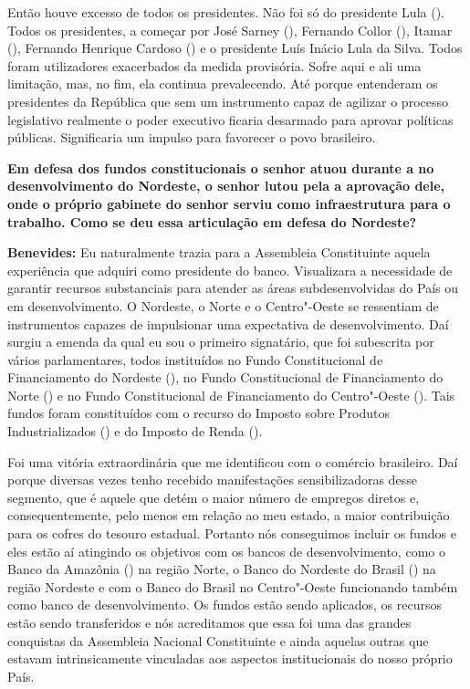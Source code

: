 Então houve excesso de todos os presidentes. Não foi só do presidente
Lula (). Todos os presidentes, a começar por José Sarney (),
Fernando Collor (), Itamar (), Fernando Henrique Cardoso () e
o presidente Luís Inácio Lula da Silva. Todos foram utilizadores
exacerbados da medida provisória. Sofre aqui e ali uma limitação, mas,
no fim, ela continua prevalecendo. Até porque entenderam os presidentes
da República que sem um instrumento capaz de agilizar o processo
legislativo realmente o poder executivo ficaria desarmado para aprovar
políticas públicas. Significaria um impulso para favorecer o povo
brasileiro.

\textbf{Em defesa dos fundos constitucionais o senhor atuou durante a
 no desenvolvimento do Nordeste, o senhor lutou pela a aprovação
dele, onde o próprio gabinete do senhor serviu como infraestrutura para
o trabalho. Como se deu essa articulação em defesa do Nordeste?}

\textbf{Benevides:} Eu naturalmente trazia para a Assembleia
Constituinte aquela experiência que adquiri como presidente do banco.
Visualizara a necessidade de garantir recursos substanciais para atender
as áreas subdesenvolvidas do País ou em desenvolvimento. O Nordeste, o
Norte e o Centro"-Oeste se ressentiam de instrumentos capazes de
impulsionar uma expectativa de desenvolvimento. Daí surgiu a emenda da
qual eu sou o primeiro signatário, que foi subescrita por vários
parlamentares, todos instituídos no Fundo Constitucional de
Financiamento do Nordeste (), no Fundo Constitucional de
Financiamento do Norte () e no Fundo Constitucional de Financiamento
do Centro"-Oeste (). Tais fundos foram constituídos com o recurso do
Imposto sobre Produtos Industrializados () e do Imposto de Renda
().

Foi uma vitória extraordinária que me identificou com o comércio
brasileiro. Daí porque diversas vezes tenho recebido manifestações
sensibilizadoras desse segmento, que é aquele que detém o maior número
de empregos diretos e, consequentemente, pelo menos em relação ao meu
estado, a maior contribuição para os cofres do tesouro estadual.
Portanto nós conseguimos incluir os fundos e eles estão aí atingindo os
objetivos com os bancos de desenvolvimento, como o Banco da Amazônia
() na região Norte, o Banco do Nordeste do Brasil () na região
Nordeste e com o Banco do Brasil no Centro"-Oeste funcionando também como
banco de desenvolvimento. Os fundos estão sendo aplicados, os recursos
estão sendo transferidos e nós acreditamos que essa foi uma das grandes
conquistas da Assembleia Nacional Constituinte e ainda aquelas outras
que estavam intrinsicamente vinculadas aos aspectos institucionais do
nosso próprio País.

